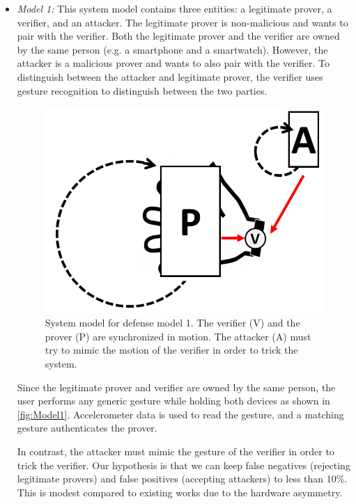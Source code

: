 \begin{itemize}
\item \emph{Model 1:} This system model contains three entities: a legitimate prover, a verifier, and an attacker. The legitimate prover is non-malicious and wants to pair with the verifier. Both the legitimate prover and the verifier are owned by the same person (e.g. a smartphone and a smartwatch). However, the attacker is a malicious prover and wants to also pair with the verifier. To distinguish between the attacker and legitimate prover, the verifier uses gesture recognition to distinguish between the two parties. 

\begin{figure}[!tb]
\centering
\includegraphics[width=0.65 \linewidth]{./figures/model1.png}
\caption{System model for defense model 1. The verifier (V) and the prover (P) are synchronized in motion. The attacker (A) must try to mimic the motion of the verifier in order to trick the system.}
\label{fig:Model1}
\end{figure}

Since the legitimate prover and verifier are owned by the same person, the user performs any generic gesture while holding both devices as shown in \autoref{fig:Model1}. Accelerometer data is used to read the gesture, and a matching gesture authenticates the prover.

In contrast, the attacker must mimic the gesture of the verifier in order to trick the verifier. Our hypothesis is that we can keep false negatives (rejecting legitimate provers) and false positives (accepting attackers) to less than 10\%. This is modest compared to existing works due to the hardware asymmetry.  



\end{itemize}
